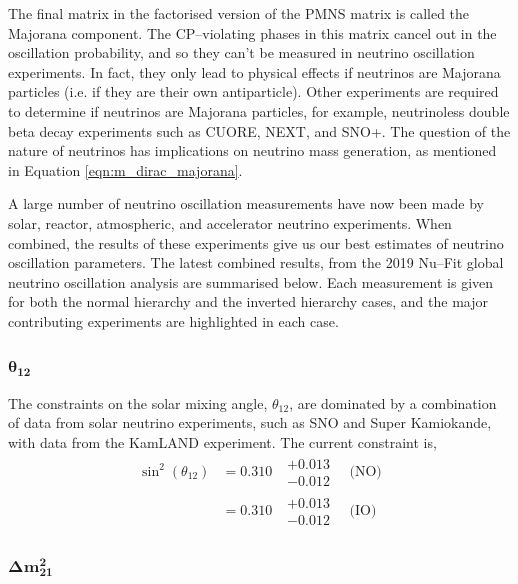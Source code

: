 The final matrix in the factorised version of the PMNS matrix is called the 
Majorana component. The CP--violating phases in this matrix cancel out in the 
oscillation probability, and so they can't be measured in neutrino oscillation 
experiments.  In fact, they only lead to physical effects if neutrinos are 
Majorana particles (i.e. if they are their own antiparticle). Other experiments 
are required to determine if neutrinos are Majorana particles, for example, 
neutrinoless double beta decay experiments such as CUORE\cite{Arnaboldi2004}, 
NEXT\cite{Alvarez2012}, and SNO+\cite{Andringa2016}. The question of the 
nature of neutrinos has implications on neutrino mass generation, as mentioned 
in Equation \ref{eqn:m_dirac_majorana}.

A large number of neutrino oscillation measurements have now been made by
solar, reactor, atmospheric, and accelerator neutrino experiments. When
combined, the results of these experiments give us our best estimates of 
neutrino oscillation parameters. The latest combined results, from the 2019 
Nu--Fit global neutrino oscillation analysis\cite{Esteban:2018azc} are 
summarised below.  Each measurement is given for both the normal hierarchy and 
the inverted hierarchy cases, and the major contributing experiments are
highlighted in each case.

\subsubsection*{$\boldsymbol{\theta_{12}}$}

The constraints on the solar mixing angle, $\theta_{12}$, are dominated by a
combination of data from solar neutrino experiments, such as SNO\cite{Ahmad2002}
and Super Kamiokande\cite{PhysRevLett.86.5651}, with data from the KamLAND 
experiment\cite{Araki2005}. The current constraint is,
\begin{align*}
	\sin^2(\theta_{12}) &= 0.310 \mbox{ } \substack{+ 0.013 \\ - 0.012} \quad \mbox{(NO)} \\
	                    &= 0.310 \mbox{ } \substack{+ 0.013 \\ - 0.012} \quad \mbox{(IO)}
\end{align*}

\subsubsection*{$\boldsymbol{\Delta m^2_{21}}$}

